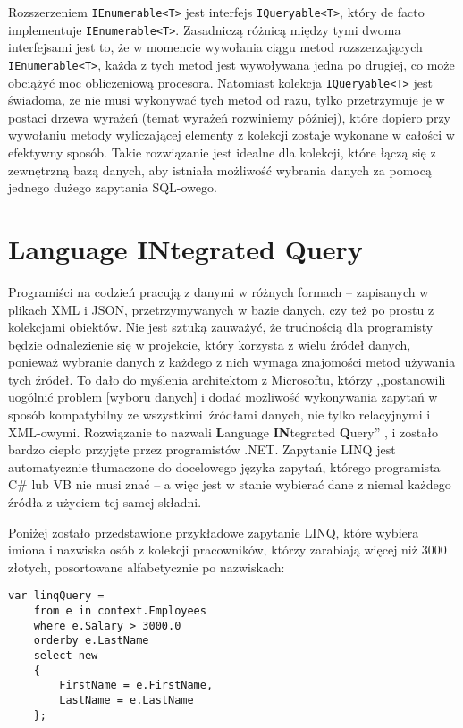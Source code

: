 Rozszerzeniem \texttt{IEnumerable<T>} jest interfejs \texttt{IQueryable<T>}, który de facto implementuje \texttt{IEnumerable<T>}. Zasadniczą różnicą między tymi dwoma interfejsami jest to, że w momencie wywołania ciągu metod rozszerzających \texttt{IEnumerable<T>}, każda z tych metod jest wywoływana jedna po drugiej, co może obciążyć moc obliczeniową procesora. Natomiast kolekcja \texttt{IQueryable<T>} jest świadoma, że nie musi wykonywać tych metod od razu, tylko przetrzymuje je w postaci drzewa wyrażeń (temat wyrażeń rozwiniemy później), które dopiero przy wywołaniu metody wyliczającej elementy z kolekcji zostaje wykonane w całości w efektywny sposób. Takie rozwiązanie jest idealne dla kolekcji, które łączą się z zewnętrzną bazą danych, aby istniała możliwość wybrania danych za pomocą jednego dużego zapytania SQL-owego.

\section{Language INtegrated Query}
Programiści na codzień pracują z danymi w różnych formach – zapisanych w plikach XML i JSON, przetrzymywanych w bazie danych, czy też po prostu z kolekcjami obiektów. Nie jest sztuką zauważyć, że trudnością dla programisty będzie odnalezienie się w projekcie, który korzysta z wielu źródeł danych, ponieważ wybranie danych z każdego z nich wymaga znajomości metod używania tych źródeł. To dało do myślenia architektom z Microsoftu, którzy ,,postanowili uogólnić problem [wyboru danych] i dodać możliwość wykonywania zapytań w sposób kompatybilny ze wszystkimi źródłami danych, nie tylko relacyjnymi i XML-owymi. Rozwiązanie to nazwali \textbf{L}anguage \textbf{IN}tegrated \textbf{Q}uery'' \cite{msdn_linq}, i zostało bardzo ciepło przyjęte przez programistów .NET. Zapytanie LINQ jest automatycznie tłumaczone do docelowego języka zapytań, którego programista C\# lub VB nie musi znać – a więc jest w stanie wybierać dane z niemal każdego źródła z użyciem tej samej składni.

Poniżej zostało przedstawione przykładowe zapytanie LINQ, które wybiera \linebreak imiona i nazwiska osób z kolekcji pracowników, którzy zarabiają więcej niż 3000 złotych, posortowane alfabetycznie po nazwiskach:

\begin{lstlisting}
var linqQuery = 
    from e in context.Employees
    where e.Salary > 3000.0
    orderby e.LastName
    select new
    { 
        FirstName = e.FirstName,
        LastName = e.LastName
    };
\end{lstlisting}

